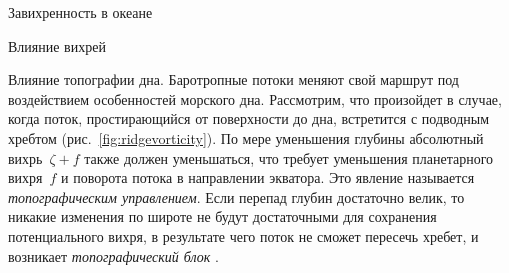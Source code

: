 \begin{chapter}{Завихренность в океане}
\begin{section}{Влияние вихрей}
\begin{paragraph}{Влияние топографии дна.} 
Баротропные потоки меняют свой маршрут под воздействием особенностей
морского дна. Рассмотрим, что произойдет в случае, когда поток,
простирающийся от поверхности до дна, встретится с подводным хребтом
(рис.~\ref{fig:ridgevorticity}). По мере уменьшения глубины абсолютный 
вихрь~$\zeta + f$ также должен уменьшаться, что требует уменьшения планетарного
вихря~$f$ и поворота потока в направлении экватора. Это явление называется
\emph{топографическим управлением}. 
Если перепад глубин достаточно велик, то никакие изменения по широте 
не будут достаточными для сохранения потенциального вихря, в результате
чего поток не сможет пересечь хребет, и возникает \emph{топографический блок}%
.
%
\end{paragraph}


\end{section}
\end{chapter}
